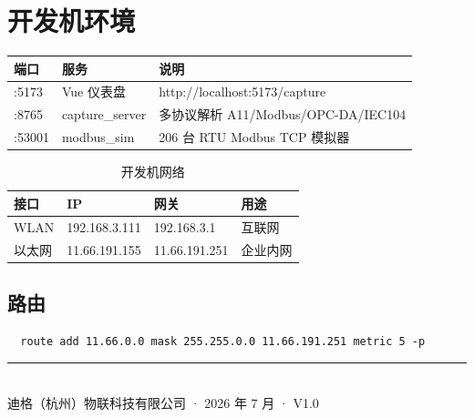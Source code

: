 \documentclass[12pt,a4paper]{ctexart}
\begin{document}
\section{开发机环境}

\begin{table}[H]\centering
\begin{tabular}{p{2cm}p{4cm}p{6cm}}
\toprule
\textbf{端口} & \textbf{服务} & \textbf{说明} \\
\midrule
:5173 & Vue 仪表盘 & http://localhost:5173/capture \\
:8765 & capture\_server & 多协议解析 A11/Modbus/OPC-DA/IEC104 \\
:53001 & modbus\_sim & 206 台 RTU Modbus TCP 模拟器 \\
\bottomrule
\end{tabular}
\end{table}

\begin{table}[H]\centering
\caption{开发机网络}
\begin{tabular}{p{3cm}p{4cm}p{2.5cm}p{3cm}}
\toprule
\textbf{接口} & \textbf{IP} & \textbf{网关} & \textbf{用途} \\
\midrule
WLAN & 192.168.3.111 & 192.168.3.1 & 互联网 \\
以太网 & 11.66.191.155 & 11.66.191.251 & 企业内网 \\
\bottomrule
\end{tabular}
\end{table}

\subsection{路由}

\begin{verbatim}
  route add 11.66.0.0 mask 255.255.0.0 11.66.191.251 metric 5 -p
\end{verbatim}

\vspace{1cm}
\begin{center}
\rule{0.5\textwidth}{0.4pt}\\[6pt]
{\small 迪格（杭州）物联科技有限公司 · 2026 年 7 月 · V1.0}
\end{center}
\end{document}
